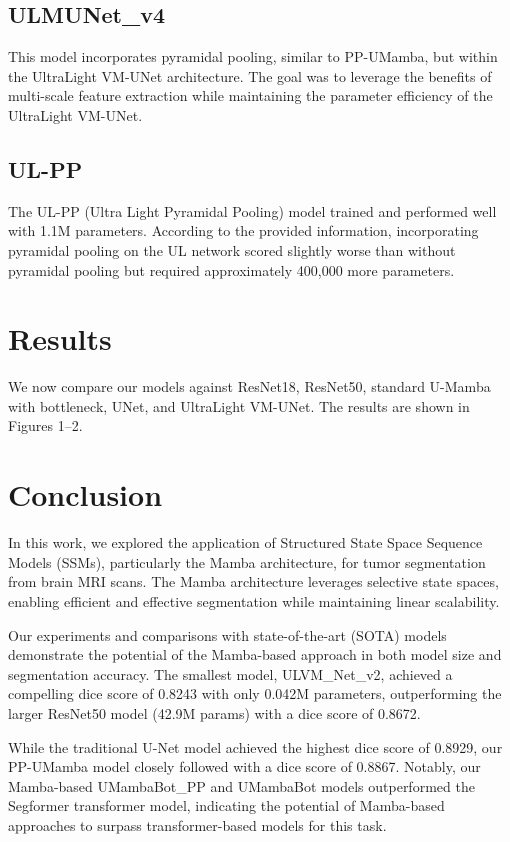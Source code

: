 \documentclass[conference]{IEEEtran}
\begin{document}
\subsection{ULMUNet\_v4}
This model incorporates pyramidal pooling, similar to PP-UMamba, but within the UltraLight VM-UNet architecture. The goal was to leverage the benefits of multi-scale feature extraction while maintaining the parameter efficiency of the UltraLight VM-UNet.

\subsection{UL-PP}
The UL-PP (Ultra Light Pyramidal Pooling) model trained and performed well with 1.1M parameters. According to the provided information, incorporating pyramidal pooling on the UL network scored slightly worse than without pyramidal pooling but required approximately 400,000 more parameters.


\section{Results}
We now compare our models against ResNet18, ResNet50, standard U-Mamba with bottleneck, UNet, and UltraLight VM-UNet. The results are shown in Figures 1--2.

\section{Conclusion}

In this work, we explored the application of Structured State Space Sequence Models (SSMs), particularly the Mamba architecture, for tumor segmentation from brain MRI scans. The Mamba architecture leverages selective state spaces, enabling efficient and effective segmentation while maintaining linear scalability.

Our experiments and comparisons with state-of-the-art (SOTA) models demonstrate the potential of the Mamba-based approach in both model size and segmentation accuracy. The smallest model, ULVM\_Net\_v2, achieved a compelling dice score of 0.8243 with only 0.042M parameters, outperforming the larger ResNet50 model (42.9M params) with a dice score of 0.8672.

While the traditional U-Net model achieved the highest dice score of 0.8929, our PP-UMamba model closely followed with a dice score of 0.8867. Notably, our Mamba-based UMambaBot\_PP and UMambaBot models outperformed the Segformer transformer model, indicating the potential of Mamba-based approaches to surpass transformer-based models for this task.
\end{document}
